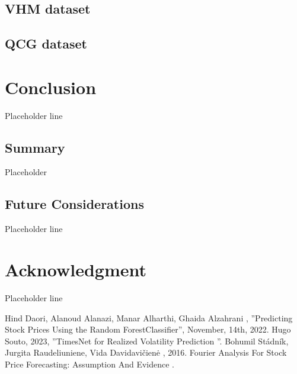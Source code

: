 \documentclass{ieeeojies}
\begin{document}
\subsection{VHM dataset} 



\subsection{QCG dataset} 

\section{Conclusion}
 Placeholder line
\subsection{Summary}
Placeholder
\subsection{Future Considerations}
Placeholder line
\section*{Acknowledgment}
Placeholder line

\begin{thebibliography}{00}
 Hind Daori, Alanoud Alanazi, Manar Alharthi, Ghaida Alzahrani
 ,  ''Predicting Stock Prices Using the Random ForestClassifier'', November, 14th, 2022.
 Hugo Souto, 2023, ''TimesNet for Realized Volatility Prediction
''.
 Bohumil Stádník, Jurgita Raudeliuniene, Vida Davidavičienė , 2016. Fourier Analysis For Stock Price Forecasting: Assumption And Evidence .

\end{thebibliography}


\EOD
\end{document}
